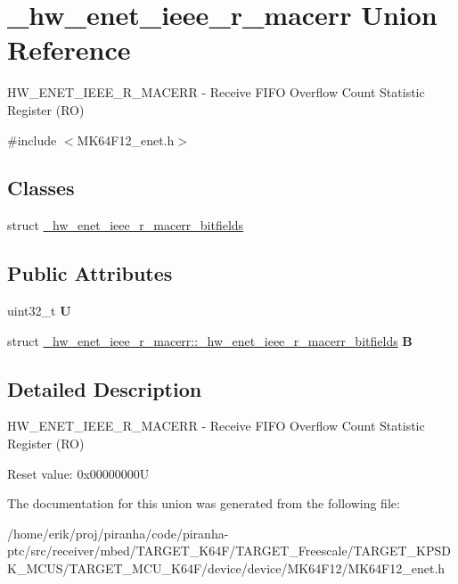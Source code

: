 \hypertarget{union__hw__enet__ieee__r__macerr}{}\section{\+\_\+hw\+\_\+enet\+\_\+ieee\+\_\+r\+\_\+macerr Union Reference}
\label{union__hw__enet__ieee__r__macerr}


H\+W\+\_\+\+E\+N\+E\+T\+\_\+\+I\+E\+E\+E\+\_\+\+R\+\_\+\+M\+A\+C\+E\+RR -\/ Receive F\+I\+FO Overflow Count Statistic Register (RO)  




{\ttfamily \#include $<$M\+K64\+F12\+\_\+enet.\+h$>$}

\subsection*{Classes}
\begin{DoxyCompactItemize}
\item 
struct \hyperlink{struct__hw__enet__ieee__r__macerr_1_1__hw__enet__ieee__r__macerr__bitfields}{\+\_\+hw\+\_\+enet\+\_\+ieee\+\_\+r\+\_\+macerr\+\_\+bitfields}
\end{DoxyCompactItemize}
\subsection*{Public Attributes}
\begin{DoxyCompactItemize}
\item 
uint32\+\_\+t {\bfseries U}\hypertarget{union__hw__enet__ieee__r__macerr_ad6b5abf8ef82e25d2888cbd9190663d4}{}\label{union__hw__enet__ieee__r__macerr_ad6b5abf8ef82e25d2888cbd9190663d4}

\item 
struct \hyperlink{struct__hw__enet__ieee__r__macerr_1_1__hw__enet__ieee__r__macerr__bitfields}{\+\_\+hw\+\_\+enet\+\_\+ieee\+\_\+r\+\_\+macerr\+::\+\_\+hw\+\_\+enet\+\_\+ieee\+\_\+r\+\_\+macerr\+\_\+bitfields} {\bfseries B}\hypertarget{union__hw__enet__ieee__r__macerr_a69a2499bb54051925c43ba9410f4bf50}{}\label{union__hw__enet__ieee__r__macerr_a69a2499bb54051925c43ba9410f4bf50}

\end{DoxyCompactItemize}


\subsection{Detailed Description}
H\+W\+\_\+\+E\+N\+E\+T\+\_\+\+I\+E\+E\+E\+\_\+\+R\+\_\+\+M\+A\+C\+E\+RR -\/ Receive F\+I\+FO Overflow Count Statistic Register (RO) 

Reset value\+: 0x00000000U 

The documentation for this union was generated from the following file\+:\begin{DoxyCompactItemize}
\item 
/home/erik/proj/piranha/code/piranha-\/ptc/src/receiver/mbed/\+T\+A\+R\+G\+E\+T\+\_\+\+K64\+F/\+T\+A\+R\+G\+E\+T\+\_\+\+Freescale/\+T\+A\+R\+G\+E\+T\+\_\+\+K\+P\+S\+D\+K\+\_\+\+M\+C\+U\+S/\+T\+A\+R\+G\+E\+T\+\_\+\+M\+C\+U\+\_\+\+K64\+F/device/device/\+M\+K64\+F12/M\+K64\+F12\+\_\+enet.\+h\end{DoxyCompactItemize}
